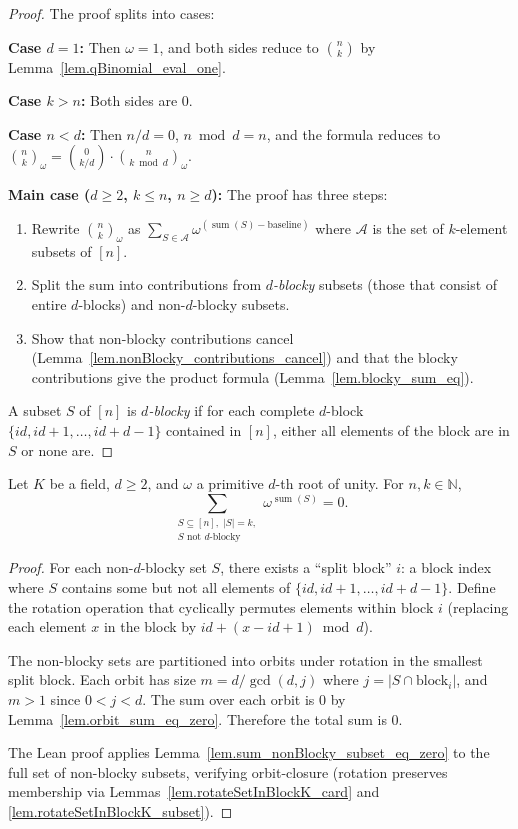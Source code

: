 \begin{proof}
The proof splits into cases:

\textbf{Case $d = 1$:} Then $\omega = 1$, and both sides reduce to
$\binom{n}{k}$ by Lemma~\ref{lem.qBinomial_eval_one}.

\textbf{Case $k > n$:} Both sides are $0$.

\textbf{Case $n < d$:} Then $n / d = 0$, $n \bmod d = n$, and the
formula reduces to $\binom{n}{k}_\omega = \binom{0}{k/d} \cdot
\binom{n}{k \bmod d}_\omega$.

\textbf{Main case ($d \geq 2$, $k \leq n$, $n \geq d$):}
The proof has three steps:
\begin{enumerate}
\item Rewrite $\binom{n}{k}_\omega$ as $\sum_{S \in \mathcal{A}}
\omega^{(\operatorname{sum}(S) - \text{baseline})}$ where $\mathcal{A}$
is the set of $k$-element subsets of $[n]$.
\item Split the sum into contributions from \emph{$d$-blocky} subsets
(those that consist of entire $d$-blocks) and non-$d$-blocky subsets.
\item Show that non-blocky contributions cancel
(Lemma~\ref{lem.nonBlocky_contributions_cancel}) and that the blocky
contributions give the product formula
(Lemma~\ref{lem.blocky_sum_eq}).
\end{enumerate}
A subset $S$ of $[n]$ is \emph{$d$-blocky} if for each complete
$d$-block $\{id, id+1, \ldots, id+d-1\}$ contained in $[n]$, either
all elements of the block are in $S$ or none are.
\end{proof}

\begin{lemma}
\label{lem.nonBlocky_contributions_cancel}
\leanhelper
\leanok
Let $K$ be a field, $d \geq 2$, and $\omega$ a primitive $d$-th root
of unity. For $n, k \in \mathbb{N}$,
\[
\sum_{\substack{S \subseteq [n],\; |S| = k,\\ S \text{ not $d$-blocky}}}
\omega^{\operatorname{sum}(S)} = 0.
\]
\end{lemma}

\begin{proof}
For each non-$d$-blocky set $S$, there exists a ``split block''
$i$: a block index where $S$ contains some but not all elements
of $\{id, id+1, \ldots, id+d-1\}$. Define the rotation operation
that cyclically permutes elements within block $i$ (replacing each
element $x$ in the block by $id + (x - id + 1) \bmod d$).

The non-blocky sets are partitioned into orbits under rotation in
the smallest split block. Each orbit has size
$m = d / \gcd(d, j)$ where $j = |S \cap \text{block}_i|$, and
$m > 1$ since $0 < j < d$. The sum over each orbit is $0$ by
Lemma~\ref{lem.orbit_sum_eq_zero}. Therefore the total sum is $0$.

The Lean proof applies Lemma~\ref{lem.sum_nonBlocky_subset_eq_zero}
to the full set of non-blocky subsets, verifying orbit-closure
(rotation preserves membership via
Lemmas~\ref{lem.rotateSetInBlockK_card} and
\ref{lem.rotateSetInBlockK_subset}).
\end{proof}

